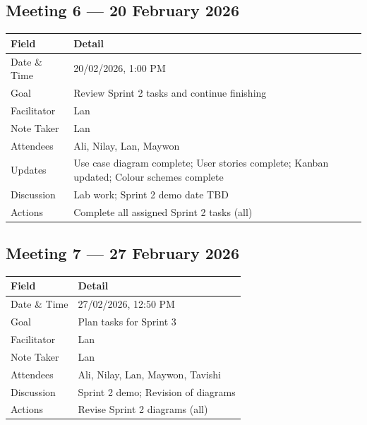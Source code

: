 \documentclass[11pt,a4paper]{article}
\begin{document}
\subsection{Meeting 6 — 20 February 2026}
\begin{table}[H]
\centering
\begin{tabularx}{\textwidth}{lX}
    \toprule
    \textbf{Field} & \textbf{Detail} \\
    \midrule
    Date \& Time    & 20/02/2026, 1:00 PM \\
    Goal            & Review Sprint 2 tasks and continue finishing \\
    Facilitator     & Lan \\
    Note Taker      & Lan \\
    Attendees       & Ali, Nilay, Lan, Maywon \\
    \midrule
    Updates         & Use case diagram complete; User stories complete; Kanban updated; Colour schemes complete \\
    Discussion      & Lab work; Sprint 2 demo date TBD \\
    Actions         & Complete all assigned Sprint 2 tasks (all) \\
    \bottomrule
\end{tabularx}
\end{table}

\subsection{Meeting 7 — 27 February 2026}
\begin{table}[H]
\centering
\begin{tabularx}{\textwidth}{lX}
    \toprule
    \textbf{Field} & \textbf{Detail} \\
    \midrule
    Date \& Time    & 27/02/2026, 12:50 PM \\
    Goal            & Plan tasks for Sprint 3 \\
    Facilitator     & Lan \\
    Note Taker      & Lan \\
    Attendees       & Ali, Nilay, Lan, Maywon, Tavishi \\
    \midrule
    Discussion      & Sprint 2 demo; Revision of diagrams \\
    Actions         & Revise Sprint 2 diagrams (all) \\
    \bottomrule
\end{tabularx}
\end{table}
\end{document}
